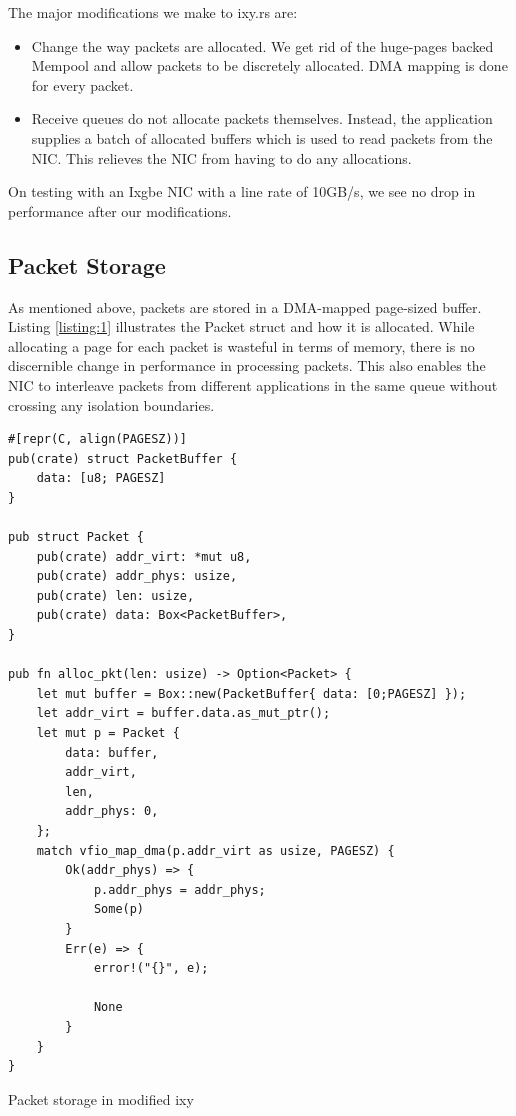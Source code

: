 The major modifications we make to ixy.rs are:
\begin{itemize}
    \item{Change the way packets are allocated. We get rid of the huge-pages backed Mempool and allow packets to be discretely allocated. DMA mapping is done for every packet. }
\item{Receive queues do not allocate packets themselves. Instead, the application supplies a batch of allocated buffers which is used to read packets from the NIC. This relieves the NIC from having to do any allocations. }
\end{itemize}

On testing with an Ixgbe NIC with a line rate of 10GB/s, we see no drop in performance after our modifications.

\subsection{Packet Storage}
As mentioned above, packets are stored in a DMA-mapped page-sized buffer. Listing \ref{listing:1} illustrates the Packet struct and how it is allocated. While allocating a page for each packet is wasteful in terms of memory, there is no discernible change in performance in processing packets. This also enables the NIC to interleave packets from different applications in the same queue without crossing any isolation boundaries.

\begin{listing}[!htbp]
\begin{verbatim}
#[repr(C, align(PAGESZ))]
pub(crate) struct PacketBuffer {
    data: [u8; PAGESZ]
}

pub struct Packet {
    pub(crate) addr_virt: *mut u8,
    pub(crate) addr_phys: usize,
    pub(crate) len: usize,
    pub(crate) data: Box<PacketBuffer>,
}

pub fn alloc_pkt(len: usize) -> Option<Packet> {
    let mut buffer = Box::new(PacketBuffer{ data: [0;PAGESZ] });
    let addr_virt = buffer.data.as_mut_ptr();
    let mut p = Packet {
        data: buffer,
        addr_virt,
        len,
        addr_phys: 0,
    };
    match vfio_map_dma(p.addr_virt as usize, PAGESZ) {
        Ok(addr_phys) => {
            p.addr_phys = addr_phys;
            Some(p)
        }
        Err(e) => {
            error!("{}", e);

            None
        }
    }
}
\end{verbatim}
\caption{Packet storage in modified ixy}
\label{listing:1}
\end{listing}


